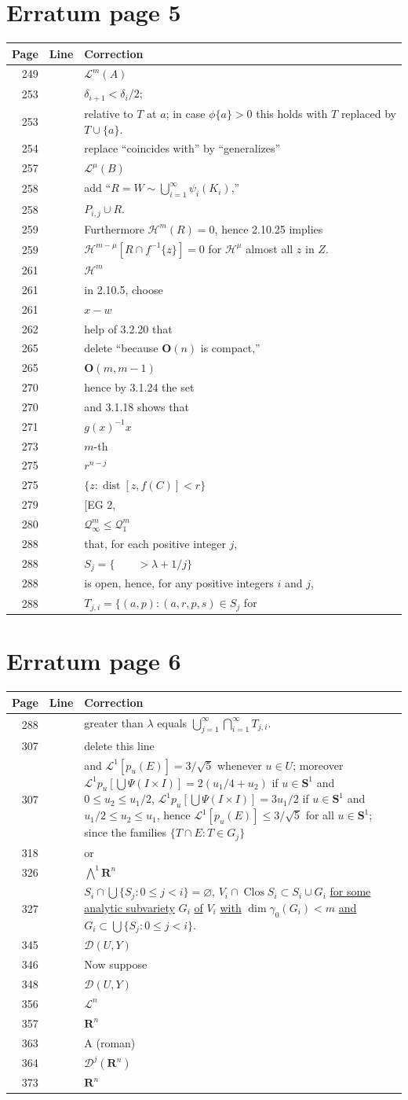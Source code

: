 \documentclass[11pt]{article}
\makeatletter
\newcommand{\R}{\mathbf R}
\newcommand{\Leb}{\mathscr L}
\newcommand{\Haus}{\mathscr H}
\newcommand{\Clos}{\operatorname{Clos}}
\newcommand{\entry}[3]{#1&#2&#3\\[4pt]}
\newenvironment{corrections}{%
  \begin{longtable}{@{}r >{\raggedright\arraybackslash}p{21mm} >{\raggedright\arraybackslash}p{118mm}@{}}
  \textbf{Page}&\textbf{Line}&\textbf{Correction}\\\hline\endhead
}{\end{longtable}}
\makeatother
\begin{document}
\section*{Erratum page 5}
\begin{corrections}
\entry{249}{21}{$\Leb^m(A)$}
\entry{253}{29}{$\delta_{i+1}<\delta_i/2$;}
\entry{253}{32}{relative to $T$ at $a$; in case $\phi\{a\}>0$ this holds with $T$ replaced by $T\cup\{a\}$.}
\entry{254}{2}{replace ``coincides with'' by ``generalizes''}
\entry{257}{26}{$\Leb^\mu(B)$}
\entry{258}{20}{add ``$\displaystyle R=W\sim\bigcup_{i=1}^{\infty}\psi_i(K_i)$,''}
\entry{258}{22}{$P_{i,j}\cup R$.}
\entry{259}{3}{Furthermore $\Haus^m(R)=0$, hence 2.10.25 implies}
\entry{259}{4}{$\Haus^{m-\mu}[R\cap f^{-1}\{z\}]=0$ for $\Haus^\mu$ almost all $z$ in $Z$.}
\entry{261}{4}{$\Haus^m$}
\entry{261}{22}{in 2.10.5, choose}
\entry{261}{29}{$x-w$}
\entry{262}{14}{help of 3.2.20 that}
\entry{265}{3}{delete ``because $\mathbf O(n)$ is compact,''}
\entry{265}{12}{$\mathbf O(m,m-1)$}
\entry{270}{25}{hence by 3.1.24 the set}
\entry{270}{28}{and 3.1.18 shows that}
\entry{271}{24}{$g(x)^{-1}x$}
\entry{273}{18}{$m$-th}
\entry{275}{2}{$r^{n-j}$}
\entry{275}{14}{$\{z:\operatorname{dist}[z,f(C)]<r\}$}
\entry{279}{27}{[EG 2,}
\entry{280}{6}{$\mathscr Q_\infty^m\le\mathscr Q_1^m$}
\entry{288}{1}{that, for each positive integer $j$,}
\entry{288}{2}{$S_j=\{\qquad >\lambda+1/j\}$}
\entry{288}{3}{is open, hence, for any positive integers $i$ and $j$,}
\entry{288}{4}{$T_{j,i}=\{(a,p):(a,r,p,s)\in S_j$ for}
\end{corrections}

\section*{Erratum page 6}
\begin{corrections}
\entry{288}{6}{greater than $\lambda$ equals $\displaystyle\bigcup_{j=1}^{\infty}\bigcap_{i=1}^{\infty}T_{j,i}$.}
\entry{307}{7}{delete this line}
\entry{307}{26}{and $\Leb^1[p_u(E)]=3/\sqrt5$ whenever $u\in U$; moreover\newline
$\Leb^1p_u[\bigcup\Psi(I\times I)]=2(u_1/4+u_2)$ if $u\in\mathbf S^1$ and $0\le u_2\le u_1/2$,\newline
$\Leb^1p_u[\bigcup\Psi(I\times I)]=3u_1/2$ if $u\in\mathbf S^1$ and $u_1/2\le u_2\le u_1$,\newline
hence $\Leb^1[p_u(E)]\le3/\sqrt5$ for all $u\in\mathbf S^1$; since the families $\{T\cap E:T\in G_j\}$}
\entry{318}{26}{[HF 2] or}
\entry{326}{3}{$\bigwedge^1\R^n$}
\entry{327}{24}{$S_i\cap\bigcup\{S_j:0\le j<i\}=\varnothing$, $V_i\cap\Clos S_i\subset S_i\cup G_i$\newline
\underline{for some analytic subvariety} $G_i$ \underline{of} $V_i$ \underline{with}\newline
$\dim\gamma_0(G_i)<m$ \underline{and} $G_i\subset\bigcup\{S_j:0\le j<i\}$.}
\entry{345}{36}{$\mathscr D(U,Y)$}
\entry{346}{1}{Now suppose}
\entry{348}{26}{$\mathscr D(U,Y)$}
\entry{356}{16}{$\Leb^n$}
\entry{357}{17}{$\R^n$}
\entry{363}{2}{$\mathrm A$ (roman)}
\entry{364}{11}{$\mathscr D^j(\R^n)$}
\entry{373}{29}{$\R^n$}
\end{corrections}
\end{document}
